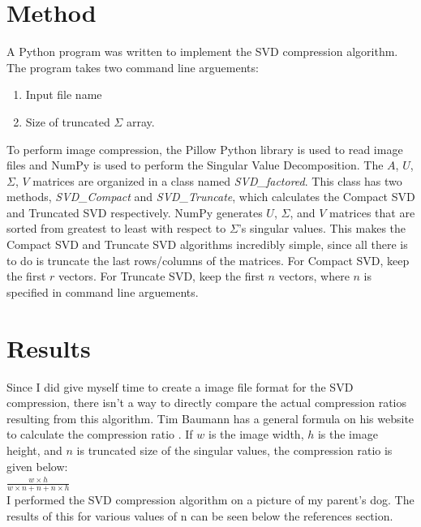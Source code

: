 \documentclass{article}
\begin{document}
\section*{Method}

A Python program was written to implement the SVD compression algorithm. 
The program takes two command line arguements: 
\begin{enumerate}
    \item Input file name
    \item Size of truncated $\Sigma$ array. 
\end{enumerate}

To perform image compression, the Pillow Python library is used to read image files and NumPy is used to perform the Singular Value Decomposition. 
The $A$, $U$, $\Sigma$, $V$ matrices are organized in a class named \emph{SVD\_factored}.
This class has two methods, \emph{SVD\_Compact} and \emph{SVD\_Truncate}, which calculates the Compact SVD and Truncated SVD respectively. 
NumPy generates $U$, $\Sigma$, and $V$ matrices that are sorted from greatest to least with respect to $\Sigma$'s singular values.
This makes the Compact SVD and Truncate SVD algorithms incredibly simple, since all there is to do is truncate the last rows/columns of the matrices.
For Compact SVD, keep the first $r$ vectors.
For Truncate SVD, keep the first $n$ vectors, where $n$ is specified in command line arguements. 

\section*{Results}

Since I did give myself time to create a image file format for the SVD compression, there isn't a way to directly compare the actual compression ratios resulting from this algorithm.
Tim Baumann has a general formula on his website to calculate the compression ratio \cite{tsvd}. 
If $w$ is the image width, $h$ is the image height, and $n$ is truncated size of the singular values, the compression ratio is given below: \\

$ \frac{w \times h}{w \times n + n + n \times h} $ \\

I performed the SVD compression algorithm on a picture of my parent's dog. 
The results of this for various values of n can be seen below the references section.
\end{document}
